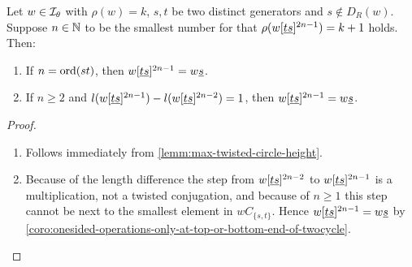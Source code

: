 \begin{coro}
	Let $w \in \mathcal{I}_{\theta}$ with $\rho(w) = k$, $s,t$ be two distinct generators and $s \notin D_R(w)$. Suppose $n \in \mathbb{N}$ to be the smallest number for that $\rho(w[\underline{t} \underline{s}]^{2n-1}) = k + 1$ holds. Then:

	\begin{enumerate}
		\item If $n = \operatorname{ord}(st)$, then $w[\underline{t} \underline{s}]^{2n-1} = w \underline{s}$.
		\item If $n \geq 2$ and $l(w[\underline{t} \underline{s}]^{2n-1}) - l(w[\underline{t} \underline{s}]^{2n-2}) = 1$, then $w[\underline{t} \underline{s}]^{2n-1} = w \underline{s}$.
	\end{enumerate}

	\begin{proof}

		\begin{enumerate}
			\item Follows immediately from \ref{lemm:max-twisted-circle-height}.
			\item Because of the length difference the step from $w[\underline{t} \underline{s}]^{2n-2}$ to $w[\underline{t} \underline{s}]^{2n-1}$ is a multiplication, not a twisted conjugation, and because of $n \geq 1$ this step cannot be next to the smallest element in $wC_{\{s,t\}}$. Hence $w[\underline{t} \underline{s}]^{2n-1} = w \underline{s}$ by \ref{coro:onesided-operations-only-at-top-or-bottom-end-of-twocycle}. \qedhere
		\end{enumerate}
	\end{proof}
\end{coro}


